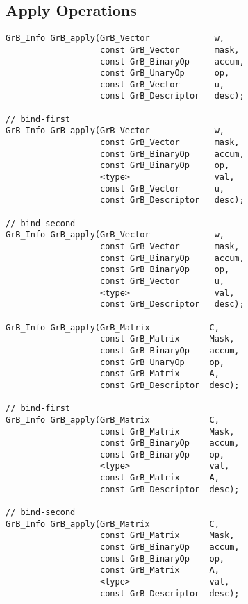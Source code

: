 \documentclass[11pt]{article}
\begin{document}
\subsection{Apply Operations}

\begin{verbatim}
GrB_Info GrB_apply(GrB_Vector             w,
                   const GrB_Vector       mask,
                   const GrB_BinaryOp     accum,
                   const GrB_UnaryOp      op,
                   const GrB_Vector       u,
                   const GrB_Descriptor   desc);

// bind-first
GrB_Info GrB_apply(GrB_Vector             w,
                   const GrB_Vector       mask,
                   const GrB_BinaryOp     accum,
                   const GrB_BinaryOp     op,
                   <type>                 val,
                   const GrB_Vector       u,
                   const GrB_Descriptor   desc);

// bind-second
GrB_Info GrB_apply(GrB_Vector             w,
                   const GrB_Vector       mask,
                   const GrB_BinaryOp     accum,
                   const GrB_BinaryOp     op,
                   const GrB_Vector       u,
                   <type>                 val,
                   const GrB_Descriptor   desc);

GrB_Info GrB_apply(GrB_Matrix            C,
                   const GrB_Matrix      Mask,
                   const GrB_BinaryOp    accum,
                   const GrB_UnaryOp     op,
                   const GrB_Matrix      A,
                   const GrB_Descriptor  desc);

// bind-first
GrB_Info GrB_apply(GrB_Matrix            C,
                   const GrB_Matrix      Mask,
                   const GrB_BinaryOp    accum,
                   const GrB_BinaryOp    op,
                   <type>                val,
                   const GrB_Matrix      A,
                   const GrB_Descriptor  desc);

// bind-second
GrB_Info GrB_apply(GrB_Matrix            C,
                   const GrB_Matrix      Mask,
                   const GrB_BinaryOp    accum,
                   const GrB_BinaryOp    op,
                   const GrB_Matrix      A,
                   <type>                val,
                   const GrB_Descriptor  desc);
\end{verbatim}

\end{document}
